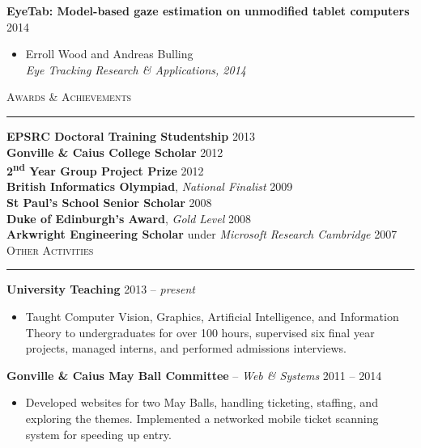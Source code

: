 \documentclass{article}
\begin{document}
\textbf{EyeTab: Model-based gaze estimation on unmodified tablet computers} \hfill  2014 \\[-6mm]
\begin{itemize}
  \item[] Erroll Wood and Andreas Bulling \\
  \emph{Eye Tracking Research \& Applications, 2014}
\end{itemize} \bigskip

\textsc{Awards \& Achievements} \smallskip \hrule \smallskip

\textbf{EPSRC Doctoral Training Studentship} \hfill 2013 \\[+1mm]
\textbf{Gonville \& Caius College Scholar} \hfill 2012 \\[+1mm]
\textbf{2\textsuperscript{nd} Year Group Project Prize} \hfill 2012 \\[+1mm]
\textbf{British Informatics Olympiad}, \emph{National Finalist} \hfill 2009 \\[+1mm]
\textbf{St Paul's School Senior Scholar} \hfill 2008 \\[+1mm]
\textbf{Duke of Edinburgh's Award}, \emph{Gold Level} \hfill 2008 \\[+1mm]
\textbf{Arkwright Engineering Scholar} under \emph{Microsoft Research Cambridge} \hfill 2007 \\

\textsc{Other Activities} \smallskip \hrule \smallskip

\textbf{University Teaching} \hfill 2013 -- \emph{present} \\[-6mm]
\begin{itemize}
  \item[]
  Taught Computer Vision, Graphics, Artificial Intelligence, and Information Theory to undergraduates for over 100 hours, supervised six final year projects, managed interns, and performed admissions interviews.
\end{itemize} \smallskip

\textbf{Gonville \& Caius May Ball Committee} -- \emph{Web \& Systems} \hfill 2011 -- 2014
\\[-6mm]
\begin{itemize}
  \item[]
  Developed websites for two May Balls, handling ticketing, staffing, and exploring the themes. Implemented a networked mobile ticket scanning system for speeding up entry.
\end{itemize} \smallskip
\end{document}
